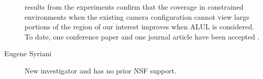 \begin{description}
results from the experiments confirm that the coverage in constrained environments when the existing camera configuration cannot view large portions of the region of our interest improves when ALUL is considered.  To date, one conference paper and one journal article have been accepted \cite{Veluchamy2011,Dukeman2011}.
\item [Eugene Syriani]  New investigator and has no prior NSF support.

\end{description}
